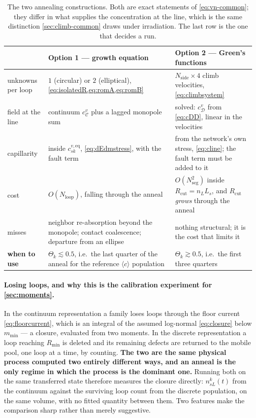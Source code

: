 \documentclass{article}
\newcommand{\cloop}{\ensuremath{\langle c\rangle}}
\begin{document}
\begin{table}[htbp]
\centering
\small
\caption{The two annealing constructions. Both are exact statements of
\cref{eq:vn-common}; they differ in what supplies the concentration at the line,
which is the same distinction \cref{sec:climb-common} draws under irradiation.
The last row is the one that decides a run.}
\label{tab:anneal-options}
\begin{tabularx}{\textwidth}{@{}p{3.3cm} X X@{}}
\toprule
 & Option 1 --- growth equation & Option 2 --- Green's functions\\
\midrule
unknowns per loop & $1$ (circular) or $2$ (elliptical),
  \cref{eq:isolatedR,eq:romA,eq:romB} &
  $N_{\mathrm{side}}\times4$ climb velocities, \cref{eq:climbsystem}\\
\addlinespace
field at the line & continuum $c^{v}_{\mathcal C}$ plus a lagged monopole sum &
  solved: $c^{v}_{\mathcal D}$ from \cref{eq:cDD}, linear in the velocities\\
\addlinespace
capillarity & inside $c^{v,\mathrm{eq}}_{sk}$, \cref{eq:dEdmstress}, with the
  fault term & from the network's own stress, \cref{eq:cline}; the fault term
  must be added to it\\
\addlinespace
cost & $O(N_{\mathrm{loop}})$, falling through the anneal &
  $O(N_{\mathrm{seg}}^2)$ inside $R_{\mathrm{cut}}=n_LL_s$, and
  $R_{\mathrm{cut}}$ \emph{grows} through the anneal\\
\addlinespace
misses & neighbor re-absorption beyond the monopole; contact coalescence;
  departure from an ellipse & nothing structural; it is the cost that limits it\\
\addlinespace
\textbf{when to use} & $\Theta_k\lesssim0.5$, i.e.\ the last quarter of the
  anneal for the reference \cloop{} population &
  $\Theta_k\gtrsim0.5$, i.e.\ the first three quarters\\
\bottomrule
\end{tabularx}
\end{table}

\paragraph{Losing loops, and why this is the calibration experiment for
\cref{sec:moments}.} In the continuum representation a family loses loops through
the floor current \cref{eq:floorcurrent}, which is an integral of the assumed
log-normal \cref{eq:closure} below $m_{\min}$ --- a closure, evaluated from two
moments. In the discrete representation a loop reaching $R_{\min}$ is deleted and
its remaining defects are returned to the mobile pool, one loop at a time, by
counting. \textbf{The two are the same physical process computed two entirely
different ways, and an anneal is the only regime in which the process is the
dominant one.} Running both on the same transferred state therefore measures the
closure directly: $n^k_{sL}(t)$ from the continuum against the surviving loop
count from the discrete population, on the same volume, with no fitted quantity
between them. Two features make the comparison sharp rather than merely
suggestive.
\end{document}
